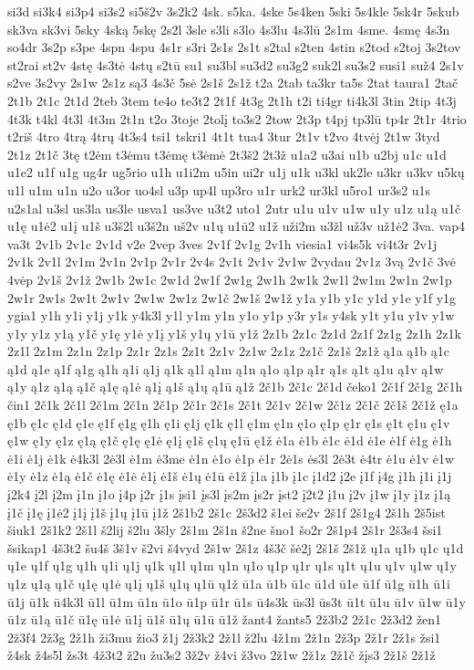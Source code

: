 {si3d
si3k4
si3p4
si3s2
si5š2v
3s2k2
4sk.
s5ka.
4ske
5s4ken
5ski
5s4kle
5sk4r
5skub
sk3va
sk3vi
5sky
4ską
5skę
2s2l
3sle
s3li
s3lo
4s3lu
4s3lū
2s1m
4sme.
4smę
4s3n
so4dr
3s2p
s3pe
4spn
4spu
4s1r
s3ri
2s1s
2s1t
s2tal
s2ten
4stin
s2tod
s2toj
3s2tov
st2rai
st2v
4stę
4s3tė
4stų
s2tū
su1
su3bl
su3d2
su3g2
suk2l
su3s2
susi1
suž4
2s1v
s2ve
3s2vy
2s1w
2s1z
są3
4s3č
5sė
2s1š
2s1ž
t2a
2tab
ta3kr
ta5s
2tat
taura1
2tač
2t1b
2t1c
2t1d
2teb
3tem
te4o
te3t2
2t1f
4t3g
2t1h
t2i
ti4gr
ti4k3l
3tin
2tip
4t3j
4t3k
t4kl
4t3l
4t3m
2t1n
t2o
3toje
2tolį
to3s2
2tow
2t3p
t4pj
tp3lū
tp4r
2t1r
4trio
t2riš
4tro
4trą
4trų
4t3s4
tsi1
tskri1
4t1t
tua4
3tur
2t1v
t2vo
4tvėj
2t1w
3tyd
2t1z
2t1č
3tę
t2ėm
t3ėmu
t3ėmę
t3ėmė
2t3š2
2t3ž
u1a2
u3ai
u1b
u2bj
u1c
u1d
u1e2
u1f
u1g
ug4r
ug5rio
u1h
u1i2m
u5in
ui2r
u1j
u1k
u3kl
uk2le
u3kr
u3kv
u5kų
u1l
u1m
u1n
u2o
u3or
uo4sl
u3p
up4l
up3ro
u1r
urk2
ur3kl
u5ro1
ur3s2
u1s
u2s1al
u3sl
us3la
us3le
usva1
us3ve
u3t2
uto1
2utr
u1u
u1v
u1w
u1y
u1z
u1ą
u1č
u1ę
u1ė2
u1į
u1š
u3š2l
u3š2n
uš2v
u1ų
u1ū2
u1ž
uži2m
u3žl
už3v
už1ė2
3va.
vap4
va3t
2v1b
2v1c
2v1d
v2e
2vep
3ves
2v1f
2v1g
2v1h
viesia1
vi4s5k
vi4t3r
2v1j
2v1k
2v1l
2v1m
2v1n
2v1p
2v1r
2v4s
2v1t
2v1v
2v1w
2vydau
2v1z
3vą
2v1č
3vė
4vėp
2v1š
2v1ž
2w1b
2w1c
2w1d
2w1f
2w1g
2w1h
2w1k
2w1l
2w1m
2w1n
2w1p
2w1r
2w1s
2w1t
2w1v
2w1w
2w1z
2w1č
2w1š
2w1ž
y1a
y1b
y1c
y1d
y1e
y1f
y1g
ygia1
y1h
y1i
y1j
y1k
y4k3l
y1l
y1m
y1n
y1o
y1p
y3r
y1s
y4sk
y1t
y1u
y1v
y1w
y1y
y1z
y1ą
y1č
y1ę
y1ė
y1į
y1š
y1ų
y1ū
y1ž
2z1b
2z1c
2z1d
2z1f
2z1g
2z1h
2z1k
2z1l
2z1m
2z1n
2z1p
2z1r
2z1s
2z1t
2z1v
2z1w
2z1z
2z1č
2z1š
2z1ž
ą1a
ą1b
ą1c
ą1d
ą1e
ą1f
ą1g
ą1h
ą1i
ą1j
ą1k
ą1l
ą1m
ą1n
ą1o
ą1p
ą1r
ą1s
ą1t
ą1u
ą1v
ą1w
ą1y
ą1z
ą1ą
ą1č
ą1ę
ą1ė
ą1į
ą1š
ą1ų
ą1ū
ą1ž
2č1b
2č1c
2č1d
čeko1
2č1f
2č1g
2č1h
čin1
2č1k
2č1l
2č1m
2č1n
2č1p
2č1r
2č1s
2č1t
2č1v
2č1w
2č1z
2č1č
2č1š
2č1ž
ę1a
ę1b
ę1c
ę1d
ę1e
ę1f
ę1g
ę1h
ę1i
ę1j
ę1k
ę1l
ę1m
ę1n
ę1o
ę1p
ę1r
ę1s
ę1t
ę1u
ę1v
ę1w
ę1y
ę1z
ę1ą
ę1č
ę1ę
ę1ė
ę1į
ę1š
ę1ų
ę1ū
ę1ž
ė1a
ė1b
ė1c
ė1d
ė1e
ė1f
ė1g
ė1h
ė1i
ė1j
ė1k
ė4k3l
2ė3l
ė1m
ė3me
ė1n
ė1o
ė1p
ė1r
2ė1s
ės3l
2ė3t
ė4tr
ė1u
ė1v
ė1w
ė1y
ė1z
ė1ą
ė1č
ė1ę
ė1ė
ė1į
ė1š
ė1ų
ė1ū
ė1ž
į1a
į1b
į1c
į1d2
į2e
į1f
į4g
į1h
į1i
į1j
į2k4
į2l
į2m
į1n
į1o
į4p
į2r
į1s
įsi1
įs3l
įs2m
įs2r
įst2
į2t2
į1u
į2v
į1w
į1y
į1z
į1ą
į1č
į1ę
į1ė2
į1į
į1š
į1ų
į1ū
į1ž
2š1b2
2š1c
2š3d2
š1ei
še2v
2š1f
2š1g4
2š1h
2š5ist
šiuk1
2š1k2
2š1l
š2lij
š2lu
3šly
2š1m
2š1n
š2ne
šno1
šo2r
2š1p4
2š1r
2š3s4
šsi1
šsikap1
4š3t2
šu4š
3š1v
š2vi
š4vyd
2š1w
2š1z
4š3č
šė2j
2š1š
2š1ž
ų1a
ų1b
ų1c
ų1d
ų1e
ų1f
ų1g
ų1h
ų1i
ų1j
ų1k
ų1l
ų1m
ų1n
ų1o
ų1p
ų1r
ų1s
ų1t
ų1u
ų1v
ų1w
ų1y
ų1z
ų1ą
ų1č
ų1ę
ų1ė
ų1į
ų1š
ų1ų
ų1ū
ų1ž
ū1a
ū1b
ū1c
ū1d
ū1e
ū1f
ū1g
ū1h
ū1i
ū1j
ū1k
ū4k3l
ū1l
ū1m
ū1n
ū1o
ū1p
ū1r
ū1s
ū4s3k
ūs3l
ūs3t
ū1t
ū1u
ū1v
ū1w
ū1y
ū1z
ū1ą
ū1č
ū1ę
ū1ė
ū1į
ū1š
ū1ų
ū1ū
ū1ž
žant4
žants5
2ž3b2
2ž1c
2ž3d2
žen1
2ž3f4
2ž3g
2ž1h
ži3mu
žio3
ž1j
2ž3k2
2ž1l
ž2lu
4ž1m
2ž1n
2ž3p
2ž1r
2ž1s
žsi1
ž4sk
ž4s5l
žs3t
4ž3t2
ž2u
žu3s2
3ž2v
ž4vi
ž3vo
2ž1w
2ž1z
2ž1č
žįs3
2ž1š
2ž1ž
}
